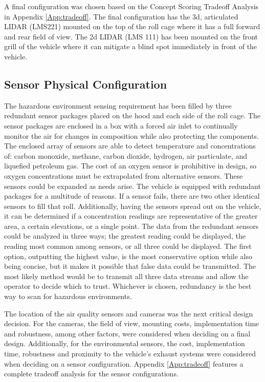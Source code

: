 A final configuration was chosen based on the Concept Scoring Tradeoff Analysis in Appendix \ref{App:tradeoff}. The final configuration has the 3d, articulated LIDAR (LMS221) mounted on the top of the roll cage where it has a full forward and rear field of view. The 2d LIDAR (LMS 111) has been mounted on the front grill of the vehicle where it can mitigate a blind spot immediately in front of the vehicle. 


\subsection{Sensor Physical Configuration}
The hazardous environment sensing requirement has been filled by three redundant sensor packages placed on the hood and each side of the roll cage. The sensor packages  are enclosed in a box with a forced air inlet to continually monitor the air for changes in composition while also protecting the components. The enclosed array of sensors are able to detect temperature and concentrations of: carbon monoxide, methane, carbon dioxide, hydrogen, air particulate, and liquefied petroleum gas. The cost of an oxygen sensor is prohibitive in design, so oxygen concentrations must be extrapolated from alternative sensors. These sensors could be expanded as needs arise. The vehicle is equipped with redundant packages for a multitude of reasons. If a sensor fails, there are two other identical sensors to fill that roll. Additionally, having the sensors spread out on the vehicle, it can be determined if a concentration readings are representative of the greater area, a certain elevations, or a single point. The data from the redundant sensors could be analyzed in three ways; the greatest reading could be displayed, the reading most common among sensors, or all three could be displayed. The first option, outputting the highest value, is the most conservative option while also being concise, but it makes it possible that false data could be transmitted. The most likely method would be to transmit all three data streams and allow the operator to decide which to trust. Whichever is chosen, redundancy is the best way to scan for hazardous environments. 

The location of the air quality sensors and cameras was the next critical design decision. For the cameras, the field of view, mounting costs, implementation time and robustness, among other factors, were considered when deciding on a final design. Additionally, for the environmental sensors, the cost, implementation time, robustness and proximity to the vehicle's exhaust systems were considered when deciding on a sensor configuration. Appendix \ref{App:tradeoff} features a complete tradeoff analysis for the sensor configurations. 

